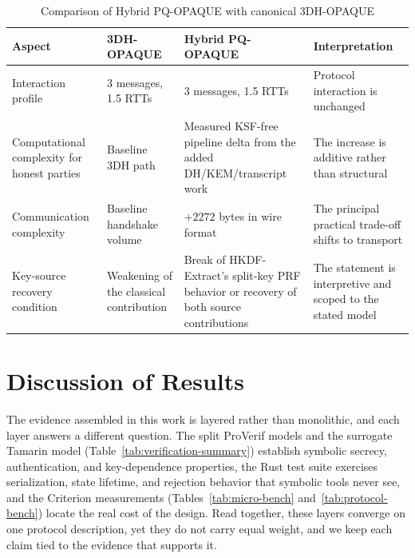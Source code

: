 \documentclass{ieeeijc}
\theoremstyle{remark}
\begin{document}
\begin{table}[t]
\caption{Comparison of Hybrid PQ-OPAQUE with canonical 3DH-OPAQUE}
\label{tab:baseline-comparison}
\centering\scriptsize
\begin{tabularx}{\textwidth}{@{}L{3.3cm}L{2.9cm}L{3.1cm}X@{}}
\toprule
Aspect & 3DH-OPAQUE & Hybrid PQ-OPAQUE & Interpretation \\
\midrule
Interaction profile & 3 messages, 1.5 RTTs & 3 messages, 1.5 RTTs & Protocol interaction is unchanged \\
Computational complexity for honest parties & Baseline 3DH path & Measured KSF-free pipeline delta from the added DH/KEM/transcript work & The increase is additive rather than structural \\
Communication complexity & Baseline handshake volume & $+2272$ bytes in wire format & The principal practical trade-off shifts to transport \\
Key-source recovery condition & Weakening of the classical contribution & Break of HKDF-Extract's split-key PRF behavior or recovery of both source contributions & The statement is interpretive and scoped to the stated model \\
\bottomrule
\end{tabularx}
\end{table}

\section{Discussion of Results}

The evidence assembled in this work is layered rather than monolithic, and each
layer answers a different question. The split ProVerif models and the surrogate
Tamarin model (Table~\ref{tab:verification-summary}) establish symbolic secrecy,
authentication, and key-dependence properties, the Rust test suite exercises
serialization, state lifetime, and rejection behavior that symbolic tools never
see, and the Criterion measurements (Tables~\ref{tab:micro-bench}
and~\ref{tab:protocol-bench}) locate the real cost of the design. Read together,
these layers converge on one protocol description, yet they do not carry equal
weight, and we keep each claim tied to the evidence that supports it.
\end{document}
